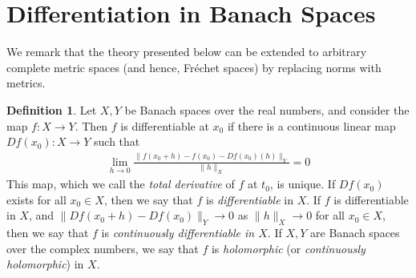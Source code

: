 \documentclass[12pt,reqno]{amsart}
\numberwithin{equation}{section}  %
\numberwithin{figure}{section}
\theoremstyle{plain}
\theoremstyle{definition}
\newtheorem{definition}{Definition}
\theoremstyle{remark}
\begin{document}
\section{Differentiation in Banach Spaces}
We remark that the theory presented below can be extended to arbitrary complete
metric spaces (and hence, Fr\'echet spaces) by replacing norms with metrics.
\begin{definition}
	\label{def:diff}
	Let $X,Y$ be Banach spaces over the real numbers, and consider the map $f: X \to Y$.
	Then $f$ is differentiable at $x_0$ if there
	is a continuous linear map $Df(x_0): X \to Y$ such that
	\begin{equation}
		\label{diff-limit}
		\begin{split}
			\lim_{h \to 0} \frac{\|f(x_0+ h) - f(x_0) -
			Df(x_0)(h) \|_Y}{\|h\|_{X}} = 0
		\end{split}
	\end{equation}
	This map, which we call the \emph{total derivative} of $f$ at $t_0$, is 
	unique. If $Df(x_0)$ exists for all $x_0 \in X$,
	then we say that $f$ is
	\emph{differentiable} in $X$. If $f$ is differentiable in $X$, and 
	$\|Df(x_0 + h) - Df(x_0) \|_Y \to 0$ as $\|h\|_{X} \to 0$ for all $x_0 \in X$,
	then we say that $f$ is \emph{continuously differentiable in $X$}. If $X, Y$
  are Banach spaces over the complex numbers, we say that $f$ is
  \emph{holomorphic} (or \emph{continuously holomorphic}) in $X$.
\end{definition}
\end{document}
